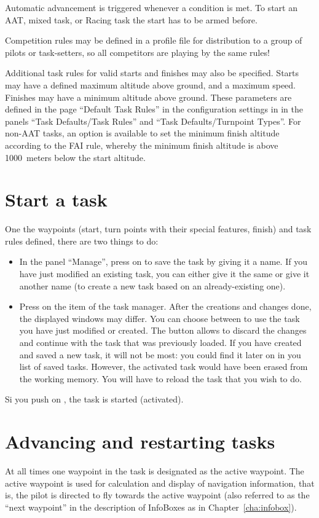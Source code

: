 Automatic advancement is triggered whenever a condition is met. To start an AAT,
mixed task, or Racing task the start has to be armed before. 

\tip{} Competition rules may be defined in a profile file for
distribution to a group of pilots or task-setters, so all competitors
are playing by the same rules!

Additional task rules for valid starts and finishes may also be
specified.  Starts may have a defined maximum altitude above ground,
and a maximum speed.  Finishes may have a minimum altitude above
ground.  These parameters are defined in the page ``Default Task Rules'' in
the configuration  settings in 
\blink{} in the panels ``Task Defaults/Task Rules'' and ``Task Defaults/Turnpoint Types''.
For non-AAT tasks, an option is available to set the minimum finish
altitude according to the FAI rule, whereby the minimum finish
altitude is above 1000~meters below the start altitude.


\section{Start a task}\label{sec:start-task}
One the waypoints (start, turn points with their special features, finish) and task rules defined, there are two things to do:
\begin{itemize}
\item In the panel ``Manage'', press on  to save the task by giving it a name. If you have just modified an existing task, you can either give it the same or give it another name (to create a new task based on an already-existing one).
\item Press on the item  of the task manager.
After the creations and changes done, the displayed windows may differ.
You can choose between  to use the task you have just modified or created.
The button  allows to discard the changes and continue with the task that was previously loaded.
If you have created and saved a new task, it will not be most: you could find it later on in you list of saved tasks.
However, the activated task would have been erased from the working memory.
You will have to reload the task that you wish to do.
\end{itemize}
Si you push on , the task is started (activated).

\section{Advancing and restarting tasks}\label{sec:advanc-rest-tasks}
At all times one waypoint in the task is designated as the active
waypoint.  The active waypoint is used for calculation and display of
navigation information, that is, the pilot is directed to fly towards
the active waypoint (also referred to as the ``next waypoint'' in the
description of InfoBoxes as in Chapter~\ref{cha:infobox}).

